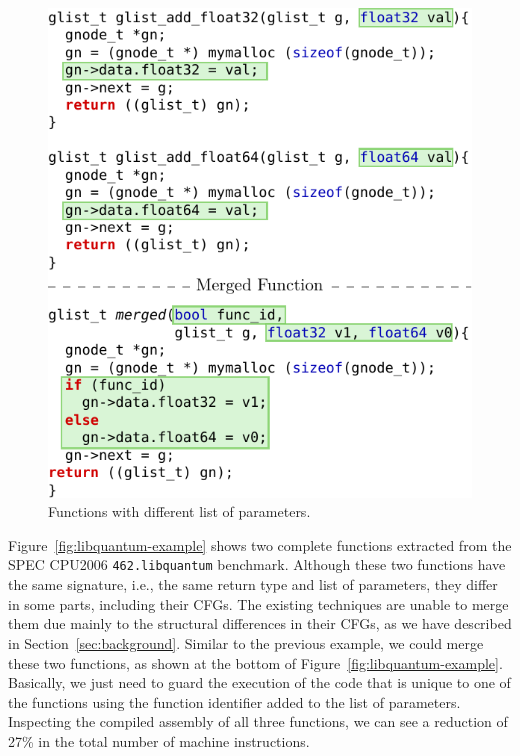 \begin{figure}[t!]
  \centering
  \includegraphics[width=.95\linewidth]{figs/sphinx-example.pdf}
  \caption{Functions with different list of parameters.}
  \label{fig:sphinx-example}
\end{figure}


Figure~\ref{fig:libquantum-example} shows two complete functions extracted from the SPEC CPU2006 \texttt{462.libquantum} benchmark.
Although these two functions have the same signature, i.e., the same return type and list of parameters, they differ in some parts,
including their CFGs. The existing techniques are unable to merge them due mainly to the structural differences in their CFGs, as we have
described in Section~\ref{sec:background}.
Similar to the previous example, we could merge these two functions, as shown at the bottom of Figure~\ref{fig:libquantum-example}. Basically, we just need to guard the execution of the code that is unique to
one of the functions using the function identifier added to the list of parameters.
Inspecting the compiled assembly of all three functions, we can see a reduction of 27\% in the total number of machine instructions.

